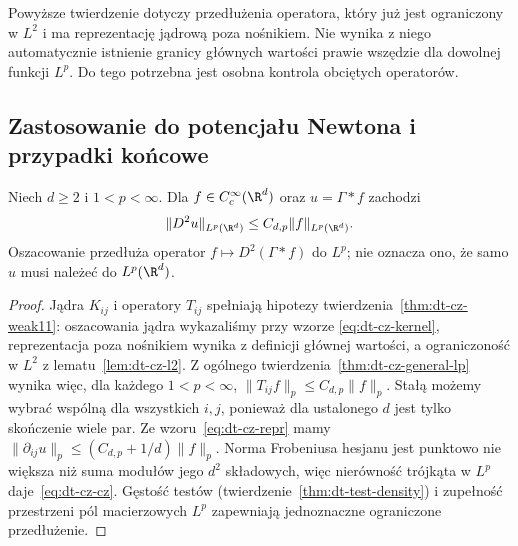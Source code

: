 \begin{uwaga}
Powyższe twierdzenie dotyczy przedłużenia operatora,
który już jest ograniczony w $L^2$ i ma reprezentację
jądrową poza nośnikiem. Nie wynika z niego automatycznie
istnienie granicy głównych wartości prawie wszędzie
dla dowolnej funkcji $L^p$. Do tego potrzebna jest
osobna kontrola obciętych operatorów.
\end{uwaga}

\subsection{Zastosowanie do potencjału Newtona i przypadki końcowe}
\begin{twierdzenie}
\label{thm:dt-cz-cz}
Niech $d\ge2$ i $1<p<\infty$. Dla
$f\in C_c^\infty(\R^d)$ oraz $u=\Gamma*f$ zachodzi
\begin{equation}\label{eq:dt-cz-cz}
 \|D^2u\|_{L^p(\R^d)}\le C_{d,p}\|f\|_{L^p(\R^d)}.
\end{equation}
Oszacowanie przedłuża operator $f\mapsto D^2(\Gamma*f)$
do $L^p$; nie oznacza ono, że samo $u$ musi należeć
do $L^p(\R^d)$.
\end{twierdzenie}
\begin{proof}
Jądra $K_{ij}$ i operatory $T_{ij}$ spełniają hipotezy
twierdzenia~\ref{thm:dt-cz-weak11}: oszacowania jądra
wykazaliśmy przy wzorze \eqref{eq:dt-cz-kernel}, reprezentacja
poza nośnikiem wynika z definicji głównej wartości,
a ograniczoność w $L^2$ z lematu~\ref{lem:dt-cz-l2}.
Z ogólnego twierdzenia~\ref{thm:dt-cz-general-lp}
wynika więc, dla każdego $1<p<\infty$,
$\|T_{ij}f\|_p\le C_{d,p}\|f\|_p$.
Stałą możemy wybrać wspólną dla wszystkich $i,j$,
ponieważ dla ustalonego $d$ jest tylko skończenie wiele par.
Ze wzoru~\eqref{eq:dt-cz-repr} mamy
$\|\partial_{ij}u\|_p\le(C_{d,p}+1/d)\|f\|_p$.
Norma Frobeniusa hesjanu jest punktowo nie większa
niż suma modułów jego $d^2$ składowych, więc nierówność
trójkąta w $L^p$ daje~\eqref{eq:dt-cz-cz}.
Gęstość testów (twierdzenie~\ref{thm:dt-test-density})
i zupełność przestrzeni pól macierzowych $L^p$
zapewniają jednoznaczne ograniczone przedłużenie.
\end{proof}

